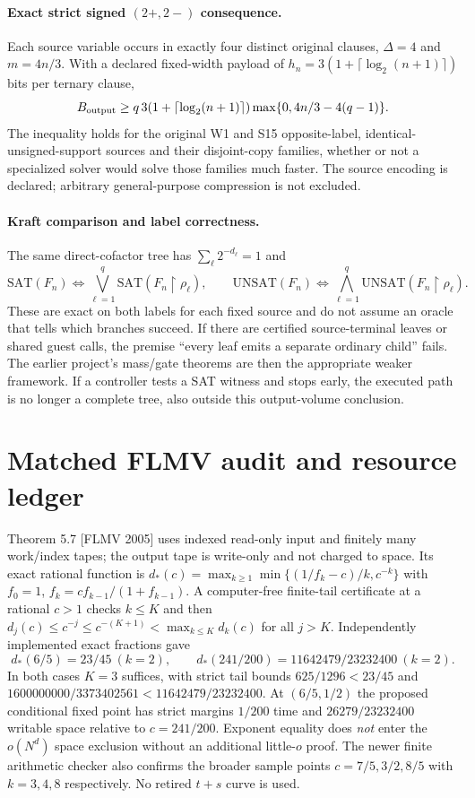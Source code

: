\documentclass[11pt]{article}
\begin{document}
\paragraph{Exact strict signed $(2+,2-)$ consequence.} Each source variable occurs in exactly four distinct original clauses, $\Delta=4$ and $m=4n/3$. With a declared fixed-width payload of $h_n=3(1+\lceil\log_2(n+1)\rceil)$ bits per ternary clause,
\[
 B_{\rm output}\ge q\,3(1+\lceil\log_2(n+1)\rceil)\max\{0,4n/3-4(q-1)\}.
\]
The inequality holds for the original W1 and S15 opposite-label, identical-unsigned-support sources and their disjoint-copy families, whether or not a specialized solver would solve those families much faster. The source encoding is declared; arbitrary general-purpose compression is not excluded.

\paragraph{Kraft comparison and label correctness.} The same direct-cofactor tree has $\sum_{\ell}2^{-d_\ell}=1$ and
\[
 \mathrm{SAT}(F_n)\iff\bigvee_{\ell=1}^q \mathrm{SAT}(F_n\upharpoonright\rho_\ell),\qquad
 \mathrm{UNSAT}(F_n)\iff\bigwedge_{\ell=1}^q\mathrm{UNSAT}(F_n\upharpoonright\rho_\ell).
\]
These are exact on both labels for each fixed source and do not assume an oracle that tells which branches succeed. If there are certified source-terminal leaves or shared guest calls, the premise ``every leaf emits a separate ordinary child'' fails. The earlier project's mass/gate theorems are then the appropriate weaker framework. If a controller tests a SAT witness and stops early, the executed path is no longer a complete tree, also outside this output-volume conclusion.

\section*{Matched FLMV audit and resource ledger}
Theorem 5.7 [FLMV 2005] uses indexed read-only input and finitely many work/index tapes; the output tape is write-only and not charged to space. Its exact rational function is $d_*(c)=\max_{k\ge1}\min\{(1/f_k-c)/k,c^{-k}\}$ with $f_0=1$, $f_k=cf_{k-1}/(1+f_{k-1})$. A computer-free finite-tail certificate at a rational $c>1$ checks $k\le K$ and then $d_j(c)\le c^{-j}\le c^{-(K+1)}<\max_{k\le K}d_k(c)$ for all $j>K$. Independently implemented exact fractions gave
\[
 d_*(6/5)=23/45\ (k=2),\qquad
 d_*(241/200)=11642479/23232400\ (k=2).
\]
In both cases $K=3$ suffices, with strict tail bounds $625/1296<23/45$ and $1600000000/3373402561<11642479/23232400$. At $(6/5,1/2)$ the proposed conditional fixed point has strict margins $1/200$ time and $26279/23232400$ writable space relative to $c=241/200$. Exponent equality does \emph{not} enter the $o(N^d)$ space exclusion without an additional little-$o$ proof. The newer finite arithmetic checker also confirms the broader sample points $c=7/5,3/2,8/5$ with $k=3,4,8$ respectively. No retired $t+s$ curve is used.
\end{document}
